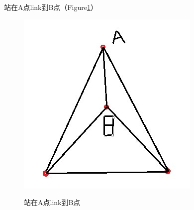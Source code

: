 \documentclass[12pt]{article}
\theoremstyle{definition}
\theoremstyle{remark}
\numberwithin{equation}{section}
\begin{document}
站在A点link到B点（Figure\ref{m13}）
\begin{figure}
  \centering
  \includegraphics[scale=0.5]{pictures/m13.png}\\
  \caption{站在A点link到B点}
  \label{m13}
\end{figure}
\end{document}
